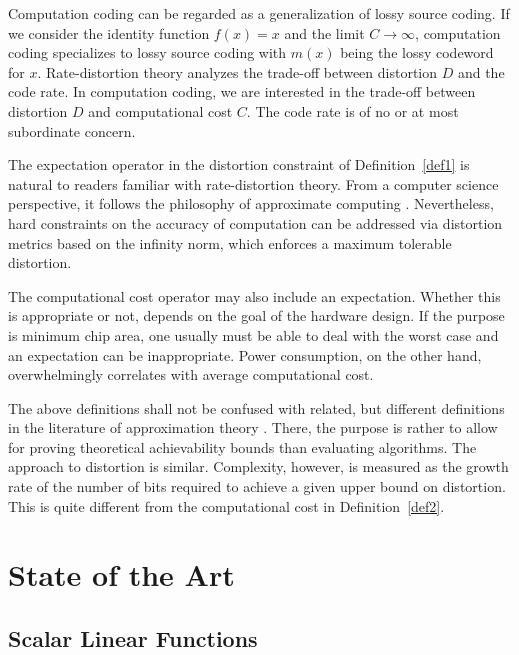 \documentclass[twocolumn]{IEEEtran}
\begin{document}
Computation coding can be regarded as a generalization of lossy source coding.
If we consider the identity function $f(x)=x$ and the limit $C\to\infty$, computation coding specializes to lossy source coding with $m(x)$ being the lossy codeword for $x$.
Rate-distortion theory analyzes the trade-off between distortion $D$ and the code rate. In computation coding, we are interested in the trade-off between distortion $D$ and computational cost $C$. The code rate is of no or at most subordinate concern.

The expectation operator in the distortion constraint of Definition~\ref{def1} is natural to readers familiar with rate-distortion theory. From a computer science perspective, it follows the philosophy of approximate computing \cite{palem:13}. Nevertheless, hard constraints on the accuracy of computation can be addressed via distortion metrics based on the infinity norm, which enforces a maximum tolerable distortion.

The computational cost operator may also include an expectation. Whether this is appropriate or not, depends on the goal of the hardware design. If the purpose is minimum chip area, one usually must be able to deal with the worst case and an expectation can be inappropriate. Power consumption, on the other hand, overwhelmingly correlates with average computational cost.

The above definitions shall not be confused with related, but different definitions in the literature of approximation theory \cite{devore:98}. There, the purpose is rather to allow for proving theoretical achievability bounds than evaluating algorithms. The approach to distortion is similar. Complexity, however, is measured as the growth rate of the number of bits required to achieve a given upper bound on distortion. This is quite different from the computational cost in Definition~\ref{def2}.   

\section{State of the Art}
\label{staofart}

\subsection{Scalar Linear Functions}
\label{lincomcod}
\end{document}
